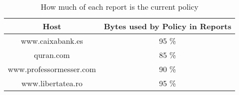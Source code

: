 \begin{table}
\begin{center}
\begin{tabular}{| c c |}
	\hline
	Host & Bytes used by Policy in Reports \\ \hline
	www.caixabank.es        & 95 \% \\ \hline 
	quran.com               & 85 \% \\ \hline 
	www.professormesser.com & 90 \% \\ \hline 
	www.libertatea.ro       & 95 \% \\ \hline 
\end{tabular}
\end{center}
\label{tab:reduction}
	\caption{How much of each report is the current policy}
\end{table}



%



